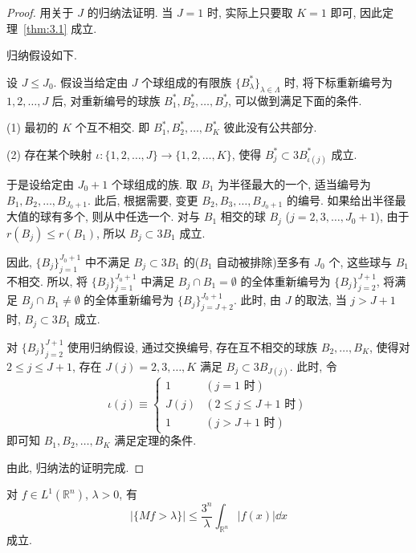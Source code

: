\begin{proof}
用关于 $J$ 的归纳法证明. 当 $J = 1$ 时, 实际上只要取 $K = 1$ 即可, 因此定理~\ref{thm:3.1} 成立.

归纳假设如下.

设 $J \leq J_{0}$. 假设当给定由 $J$ 个球组成的有限族 $\{B_{\lambda}^{*}\}_{\lambda \in \Lambda}$ 时, 将下标重新编号为 $1, 2, \ldots, J$ 后, 对重新编号的球族 $B_{1}^{*}, B_{2}^{*}, \ldots, B_{J}^{*}$, 可以做到满足下面的条件.

(1) 最初的 $K$ 个互不相交. 即 $B_{1}^{*}, B_{2}^{*}, \ldots, B_{K}^{*}$ 彼此没有公共部分.

(2) 存在某个映射 $\iota: \{1, 2, \ldots, J\} \to \{1, 2, \ldots, K\}$, 使得 $B_{j}^{*} \subset 3B_{\iota(j)}^{*}$ 成立.

于是设给定由 $J_{0}+1$ 个球组成的族. 取 $B_{1}$ 为半径最大的一个, 适当编号为 $B_{1}, B_{2}, \ldots, B_{J_{0}+1}$. 此后, 根据需要, 变更 $B_{2}, B_{3}, \ldots, B_{J_{0}+1}$ 的编号. 如果给出半径最大值的球有多个, 则从中任选一个. 对与 $B_{1}$ 相交的球 $B_{j}$ ($j = 2, 3, \ldots, J_{0}+1$), 由于 $r(B_{j}) \leq r(B_{1})$, 所以 $B_{j} \subset 3B_{1}$ 成立.

因此, $\{B_{j}\}_{j=1}^{J_{0}+1}$ 中不满足 $B_{j} \subset 3B_{1}$ 的($B_{1}$ 自动被排除)至多有 $J_{0}$ 个, 这些球与 $B_{1}$ 不相交. 所以, 将 $\{B_{j}\}_{j=1}^{J_{0}+1}$ 中满足 $B_{j} \cap B_{1} = \emptyset$ 的全体重新编号为 $\{B_{j}\}_{j=2}^{J+1}$, 将满足 $B_{j} \cap B_{1} \neq \emptyset$ 的全体重新编号为 $\{B_{j}\}_{j=J+2}^{J_{0}+1}$. 此时, 由 $J$ 的取法, 当 $j > J+1$ 时, $B_{j} \subset 3B_{1}$ 成立.

对 $\{B_{j}\}_{j=2}^{J+1}$ 使用归纳假设, 通过交换编号, 存在互不相交的球族 $B_{2}, \ldots, B_{K}$, 使得对 $2 \leq j \leq J+1$, 存在 $J(j) = 2, 3, \ldots, K$ 满足 $B_{j} \subset 3B_{J(j)}$. 此时, 令
\begin{equation}\tag{3.2}
\iota(j) \equiv \begin{cases} 1 & (j = 1 \text{ 时}) \\ J(j) & (2 \leq j \leq J+1 \text{ 时}) \\ 1 & (j > J+1 \text{ 时}) \end{cases}
\label{eq:3.2}
\end{equation}
即可知 $B_{1}, B_{2}, \ldots, B_{K}$ 满足定理的条件.

由此, 归纳法的证明完成.
\end{proof}

\begin{theorem}\label{thm:3.2}
对 $f \in L^{1}(\mathbb{R}^{n})$, $\lambda > 0$, 有
\begin{equation}\tag{3.3}
|\{Mf > \lambda\}| \leq \frac{3^{n}}{\lambda}\int_{\mathbb{R}^{n}}|f(x)|\dd x
\label{eq:3.3}
\end{equation}
成立.
\end{theorem}

